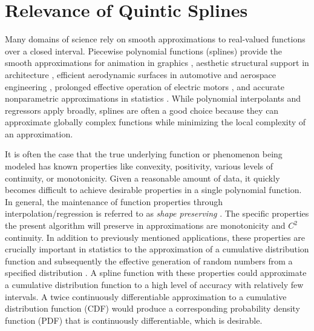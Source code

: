 \def\codent{\hskip 1.0em} %
\def\:{\mathrel{:\mathord=}}

\section{Relevance of Quintic Splines}

Many domains of science rely on smooth approximations to real-valued
functions over a closed interval. Piecewise polynomial functions
(splines) provide the smooth approximations for animation in graphics
\cite{herman2006techniques,quint2003scalable}, aesthetic structural support in
architecture \cite{brennan2020measure}, efficient aerodynamic surfaces in
automotive and aerospace engineering \cite{brennan2020measure}, prolonged
effective operation of electric motors \cite{berglund2009planning}, and
accurate nonparametric approximations in statistics \cite{knott2000interpolating}.
While polynomial interpolants and regressors apply broadly,
splines are often a good choice because they can approximate globally
complex functions while minimizing the local complexity of an
approximation.

It is often the case that the true underlying function or phenomenon
being modeled has known properties like convexity, positivity, various
levels of continuity, or monotonicity. Given a reasonable amount of
data, it quickly becomes difficult to achieve desirable properties in
a single polynomial function. In general, the maintenance of function
properties through interpolation/regression is referred to as
{\it shape preserving} \cite{fritsch1980monotone,gregory1985shape}.
The specific properties the present algorithm will preserve in
approximations are monotonicity and $C^2$ continuity. In addition to
previously mentioned applications, these properties are crucially
important in statistics to the approximation of a cumulative
distribution function and subsequently the effective generation of
random numbers from a specified distribution
\cite{ramsay1988monotone}.  A spline function with these properties
could approximate a cumulative distribution function to a high level
of accuracy with relatively few intervals. A twice continuously
differentiable approximation to a cumulative distribution function
(CDF) would produce a corresponding probability density function (PDF)
that is continuously differentiable, which is desirable.

